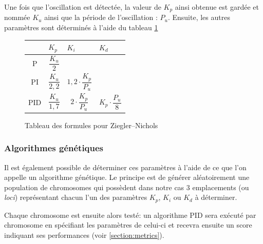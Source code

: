\documentclass[a4paper,10pt]{report}
\begin{document}
Une fois que l'oscillation est détectée, la valeur de $K_p$ ainsi obtenue est gardée et nommée $K_u$ ainsi que la période de l'oscillation : $P_u$.
Ensuite, les autres paramètres sont déterminés à l'aide du tableau \ref{tab:ZieglerNicholsTuningFormulas}

\def\tabularxcolumn#1{m{#1}}
\begin{figure}[ht]
    \begin{center}
        \begin{tabularx}{\textwidth}{| c | X | X | X |}
            \hline
            & $K_p$ & $K_i$ & $K_d$\\ \hline
            P & \begin{equation*}\frac{K_u}{2}\end{equation*} & &\\ \hline
            PI & \begin{equation*}\frac{K_u}{2,2}\end{equation*} & \begin{equation*}1,2 \cdot \frac{K_p}{P_u}\end{equation*} &\\ \hline
            PID & \begin{equation*}\frac{K_u}{1,7}\end{equation*} & \begin{equation*}2 \cdot \frac{K_p}{P_u}\end{equation*} & \begin{equation*}K_p \cdot \frac{P_u}{8}\end{equation*} \\
            \hline
        \end{tabularx}
    \end{center}
    \caption{Tableau des formules pour Ziegler–Nichols}
    \label{tab:ZieglerNicholsTuningFormulas}
\end{figure}

\subsubsection{Algorithmes génétiques}
Il est également possible de déterminer ces paramètres à l'aide de ce que l'on appelle un algorithme génétique.
Le principe est de générer aléatoirement une population de chromosomes qui possèdent dans notre cas 3 emplacements (ou \textit{loci}) représentant chacun l'un des paramètres $K_p$, $K_i$ ou $K_d$ à déterminer.

Chaque chromosome est ensuite alors testé: un algorithme PID sera exécuté par chromosome en spécifiant les paramètres de celui-ci et recevra ensuite un score indiquant ses performances (voir \ref{section:metrics}).
\end{document}
